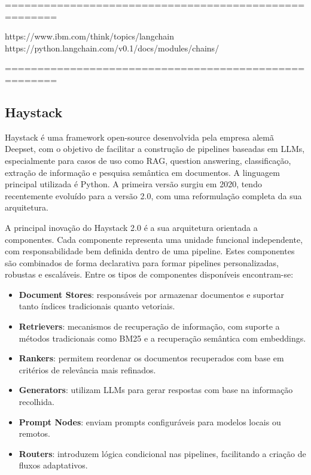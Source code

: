 ======================================================

https://www.ibm.com/think/topics/langchain
https://python.langchain.com/v0.1/docs/modules/chains/


======================================================



\subsection{Haystack}


Haystack é uma framework open-source desenvolvida pela empresa alemã Deepset, com o objetivo de facilitar a construção de pipelines baseadas em LLMs, especialmente para casos de uso como RAG, question answering, classificação, extração de informação e pesquisa semântica em documentos. A linguagem principal utilizada é Python. A primeira versão surgiu em 2020, tendo recentemente evoluído para a versão 2.0, com uma reformulação completa da sua arquitetura.


A principal inovação do Haystack 2.0 é a sua arquitetura orientada a componentes. Cada componente representa uma unidade funcional independente, com responsabilidade bem definida dentro de uma pipeline. Estes componentes são combinados de forma declarativa para formar pipelines personalizadas, robustas e escaláveis. Entre os tipos de componentes disponíveis encontram-se:

\begin{itemize} \item \textbf{Document Stores}: responsáveis por armazenar documentos e suportar tanto índices tradicionais quanto vetoriais. \item \textbf{Retrievers}: mecanismos de recuperação de informação, com suporte a métodos tradicionais como BM25 e a recuperação semântica com embeddings. \item \textbf{Rankers}: permitem reordenar os documentos recuperados com base em critérios de relevância mais refinados. \item \textbf{Generators}: utilizam LLMs para gerar respostas com base na informação recolhida. \item \textbf{Prompt Nodes}: enviam prompts configuráveis para modelos locais ou remotos. \item \textbf{Routers}: introduzem lógica condicional nas pipelines, facilitando a criação de fluxos adaptativos. \end{itemize}


